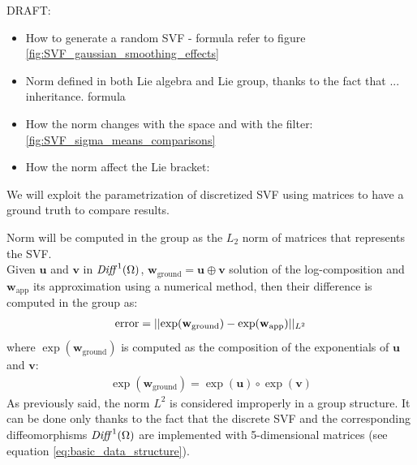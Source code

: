DRAFT:
\begin{itemize}
\item How to generate a random SVF - formula refer to figure \ref{fig:SVF_gaussian_smoothing_effects}
\item Norm defined in both Lie algebra and Lie group, thanks to the fact that ... inheritance. formula
\item How the norm changes with the space and with the filter: \ref{fig:SVF_sigma_means_comparisons}
\item How the norm affect the Lie bracket: 
\end{itemize}

We will exploit the parametrization of discretized SVF using matrices to have a ground truth to compare results. 

Norm will be computed in the group as the $L_2$ norm of matrices that represents the SVF. \\ 
Given $\mathbf{u}$ and $\mathbf{v}$ in $\text{\emph{Diff}}^{1}(\Omega)$, $\mathbf{w}_{\text{ground}} = \mathbf{u}\oplus \mathbf{v}$ solution of the log-composition and $\mathbf{w}_{\text{app}}$ its approximation using a numerical method, then their difference is computed in the group as:
\begin{align*}
\text{error} = \vert\lvert \exp(\mathbf{w}_{\text{ground}}) - \exp(\mathbf{w}_{\text{app}}) \rvert\vert_{L^{2}}
\end{align*}
where $\exp(\mathbf{w}_{\text{ground}})$ is computed as the composition of the exponentials of $\mathbf{u}$ and $\mathbf{v}$:
\begin{align*}
\exp(\mathbf{w}_{\text{ground}}) = \exp(\mathbf{u})\circ \exp(\mathbf{v})
\end{align*}
As previously said, the norm $L^2$ is considered improperly in a group structure. It can be done only thanks to the fact that the discrete SVF and the corresponding diffeomorphisms $\text{\emph{Diff}}^{1}(\Omega)$ are implemented with 5-dimensional matrices (see equation \ref{eq:basic_data_structure}).




